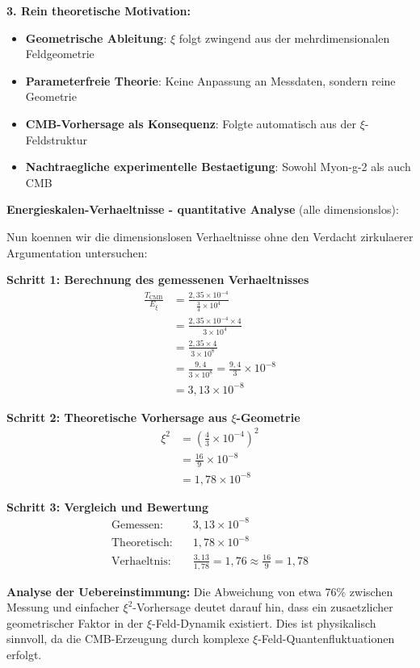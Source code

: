 \documentclass[12pt,a4paper]{article}
\begin{document}
	\textbf{3. Rein theoretische Motivation:}
	\begin{itemize}
		\item \textbf{Geometrische Ableitung}: $\xi$ folgt zwingend aus der mehrdimensionalen Feldgeometrie
		\item \textbf{Parameterfreie Theorie}: Keine Anpassung an Messdaten, sondern reine Geometrie
		\item \textbf{CMB-Vorhersage als Konsequenz}: Folgte automatisch aus der $\xi$-Feldstruktur
		\item \textbf{Nachtraegliche experimentelle Bestaetigung}: Sowohl Myon-g-2 als auch CMB
	\end{itemize}
	
	\textbf{Energieskalen-Verhaeltnisse - quantitative Analyse} (alle dimensionslos):
	
	Nun koennen wir die dimensionslosen Verhaeltnisse ohne den Verdacht zirkulaerer Argumentation untersuchen:
	
	\textbf{Schritt 1: Berechnung des gemessenen Verhaeltnisses}
	\begin{align}
		\frac{T_{\text{CMB}}}{E_\xi} &= \frac{2{,}35 \times 10^{-4}}{\frac{3}{4} \times 10^4} \\
		&= \frac{2{,}35 \times 10^{-4} \times 4}{3 \times 10^4} \\
		&= \frac{2{,}35 \times 4}{3 \times 10^8} \\
		&= \frac{9{,}4}{3 \times 10^8} = \frac{9{,}4}{3} \times 10^{-8} \\
		&= 3{,}13 \times 10^{-8}
	\end{align}
	
	\textbf{Schritt 2: Theoretische Vorhersage aus $\xi$-Geometrie}
	\begin{align}
		\xi^2 &= \left(\frac{4}{3} \times 10^{-4}\right)^2 \\
		&= \frac{16}{9} \times 10^{-8} \\
		&= 1{,}78 \times 10^{-8}
	\end{align}
	
	\textbf{Schritt 3: Vergleich und Bewertung}
	\begin{align}
		\text{Gemessen:} \quad &3{,}13 \times 10^{-8} \\
		\text{Theoretisch:} \quad &1{,}78 \times 10^{-8} \\
		\text{Verhaeltnis:} \quad &\frac{3{,}13}{1{,}78} = 1{,}76 \approx \frac{16}{9} = 1{,}78
	\end{align}
	
	\textbf{Analyse der Uebereinstimmung:}
	Die Abweichung von etwa 76\% zwischen Messung und einfacher $\xi^2$-Vorhersage deutet darauf hin, dass ein zusaetzlicher geometrischer Faktor in der $\xi$-Feld-Dynamik existiert. Dies ist physikalisch sinnvoll, da die CMB-Erzeugung durch komplexe $\xi$-Feld-Quantenfluktuationen erfolgt.
	
\end{document}

